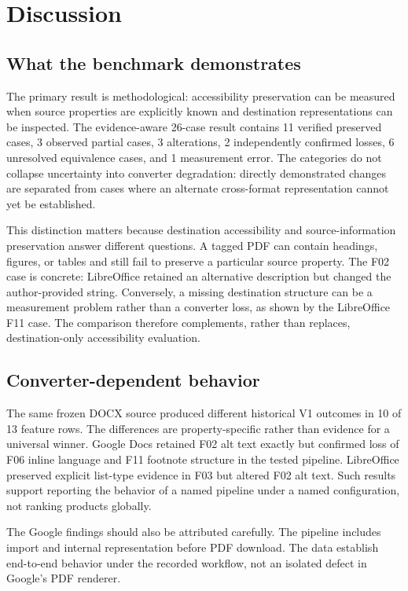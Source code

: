 \section{Discussion}
\label{sec:discussion}

\subsection{What the benchmark demonstrates}

The primary result is methodological: accessibility preservation can be measured when source properties are explicitly known and destination representations can be inspected. The evidence-aware 26-case result contains 11 verified preserved cases, 3 observed partial cases, 3 alterations, 2 independently confirmed losses, 6 unresolved equivalence cases, and 1 measurement error. The categories do not collapse uncertainty into converter degradation: directly demonstrated changes are separated from cases where an alternate cross-format representation cannot yet be established.

This distinction matters because destination accessibility and source-information preservation answer different questions. A tagged PDF can contain headings, figures, or tables and still fail to preserve a particular source property. The F02 case is concrete: LibreOffice retained an alternative description but changed the author-provided string. Conversely, a missing destination structure can be a measurement problem rather than a converter loss, as shown by the LibreOffice F11 case. The comparison therefore complements, rather than replaces, destination-only accessibility evaluation.

\subsection{Converter-dependent behavior}

The same frozen DOCX source produced different historical V1 outcomes in 10 of 13 feature rows. The differences are property-specific rather than evidence for a universal winner. Google Docs retained F02 alt text exactly but confirmed loss of F06 inline language and F11 footnote structure in the tested pipeline. LibreOffice preserved explicit list-type evidence in F03 but altered F02 alt text. Such results support reporting the behavior of a named pipeline under a named configuration, not ranking products globally.

The Google findings should also be attributed carefully. The pipeline includes import and internal representation before PDF download. The data establish end-to-end behavior under the recorded workflow, not an isolated defect in Google's PDF renderer.

